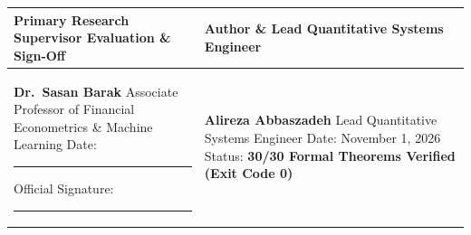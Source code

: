 \documentclass[10pt,a4paper]{article}
\begin{document}
\vspace{8pt}
\noindent\begin{tabularx}{\textwidth}{XX}
  \toprule
  \textbf{Primary Research Supervisor Evaluation \& Sign-Off} & \textbf{Author \& Lead Quantitative Systems Engineer} \\
  \midrule
  \textbf{Dr.\ Sasan Barak} \newline Associate Professor of Financial Econometrics \& Machine Learning \newline\newline Date: \rule{4.5cm}{0.4pt} \newline\newline Official Signature: \rule{4.5cm}{0.4pt} & \textbf{Alireza Abbaszadeh} \newline Lead Quantitative Systems Engineer \newline\newline Date: November 1, 2026 \newline\newline Status: \textbf{30/30 Formal Theorems Verified (Exit Code 0)} \\
  \bottomrule
\end{tabularx}
\end{document}
